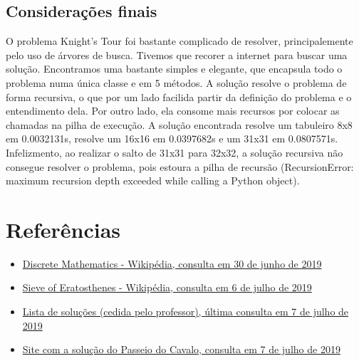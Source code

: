 \documentclass{article}
\begin{document}
    \subsection{Considerações finais}
    O problema Knight's Tour foi bastante complicado de resolver, principalemente pelo uso de árvores de busca. Tivemos que recorer a internet para buscar uma solução. Encontramos uma bastante simples e elegante, que encapsula todo o problema numa única classe e em 5 métodos. A solução resolve o problema de forma recursiva, o que por um lado facilida partir da definição do problema e o entendimento dela. Por outro lado, ela consome mais recursos por colocar as chamadas na pilha de execução.
    A solução encontrada resolve um tabuleiro 8x8 em 0.0032131s, resolve um 16x16 em 0.0397682s e um 31x31 em 0.0807571s. Infelizmento, ao realizar o salto de 31x31 para 32x32, a solução recursiva não consegue resolver o problema, pois estoura a pilha de recursão (RecursionError: maximum recursion depth exceeded while calling a Python object).


\section{Referências}
    \begin{itemize}
      \item \href{https://en.wikipedia.org/wiki/Discrete_mathematics}{Discrete Mathematics - Wikipédia, consulta em 30 de junho de 2019}
      \item \href{https://en.wikipedia.org/wiki/Sieve_of_Eratosthenes}{Sieve of Eratosthenes - Wikipédia, consulta em 6 de julho de 2019}
      \item \href{https://github.com/nayuki/Project-Euler-solutions/blob/master/Answers.txt}{Lista de soluções (cedida pelo professor), última consulta em 7 de julho de 2019}
      \item \href{http://blog.justsophie.com/algorithm-for-knights-tour-in-python/}{Site com a solução do Passeio do Cavalo, consulta em 7 de julho de 2019}
    \end{itemize}
\end{document}
